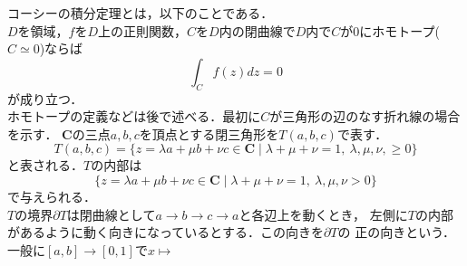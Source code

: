
コーシーの積分定理とは，以下のことである．\\
$D$を領域，$f$を$D$上の正則関数，$C$を$D$内の閉曲線で$D$内で$C$が$0$にホモトープ($C\simeq 0$)ならば
\begin{equation}
  \int_{C}f(z)dz = 0
\end{equation}
が成り立つ．\\
ホモトープの定義などは後で述べる．最初に$C$が三角形の辺のなす折れ線の場合を示す．
$\mathbf{C}$の三点$a,b,c$を頂点とする閉三角形を$T(a,b,c)$で表す．
\begin{equation}
  T(a,b,c) = \{z = \lambda a + \mu b + \nu c \in \mathbf{C} \mid \lambda + \mu + \nu = 1,\ \lambda, \mu,\nu, \geq 0\}
\end{equation}
と表される．$T$の内部は
\begin{equation}
  \{z = \lambda a + \mu b + \nu c \in \mathbf{C} \mid \lambda + \mu + \nu = 1,\ \lambda, \mu, \nu > 0\}
\end{equation}
で与えられる．\\
$T$の境界$\partial T$は閉曲線として$a\to b \to c \to a$と各辺上を動くとき，
左側に$T$の内部があるように動く向きになっているとする．この向きを$\partial T$の
正の向きという．
一般に$[a,b] \to [0,1]$で$x\mapsto $


